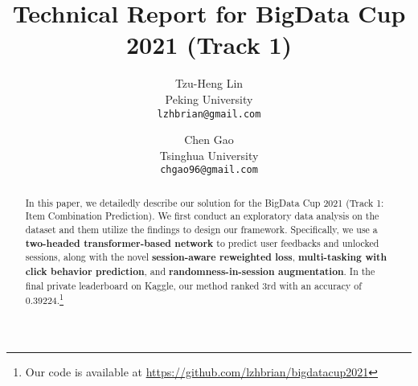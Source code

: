 \documentclass[10pt,twocolumn,letterpaper]{article}
\newcommand{\chen}[1]{\footnote{+chen+: #1}}
\begin{document}
\title{Technical Report for BigData Cup 2021 (Track 1)}

\author{Tzu-Heng Lin\\
Peking University\\
{\tt\small lzhbrian@gmail.com}
\and
Chen Gao\\
Tsinghua University\\
{\tt\small chgao96@gmail.com}
}


\twocolumn[{%
\renewcommand\twocolumn[1][]{#1}%
\maketitle
\begin{center}
    \centering
    \captionsetup{type=figure}
    \texttt{[image: figures/net.png]}
    \captionof{figure}{Overall structure of our method.}
    \label{fig:net}
\end{center}%
}]





\begin{abstract}
   In this paper, we detailedly describe our solution for the BigData Cup 2021 (Track 1: Item Combination Prediction).
   We first conduct an exploratory data analysis on the dataset and them utilize the findings to design our framework.
   Specifically, we use a \textbf{two-headed transformer-based network} to predict user feedbacks and unlocked sessions, along with the novel \textbf{session-aware reweighted loss}, \textbf{multi-tasking with click behavior prediction}, and \textbf{randomness-in-session augmentation}.
   In the final private leaderboard on Kaggle, our method ranked 3rd with an accuracy of 0.39224.\footnote{Our code is available at \url{https://github.com/lzhbrian/bigdatacup2021}}
\end{abstract}


% 





% 



\newpage


\end{document}
